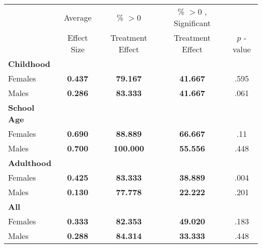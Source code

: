 \begin{tabular}{l c c c c}
\toprule
 & Average & \% $ >0 $ & \% $ >0 $ , Significant & \citet{Rosenbaum_2005_Distribution_JRSS} \\
 & Effect Size & Treatment Effect & Treatment Effect & $ p $ -value \\
\midrule
\textbf{Childhood} & & & & \\
\quad Females &  \textbf{    0.437} & \textbf{   79.167} & \textbf{   41.667} & .595 \\
\quad Males &  \textbf{    0.286} & \textbf{   83.333} & \textbf{   41.667} & .061 \\
\midrule
\textbf{School Age} & & & & \\
\quad Females &  \textbf{    0.690} & \textbf{   88.889} & \textbf{   66.667} & .11 \\
\quad Males &  \textbf{    0.700} & \textbf{  100.000} & \textbf{   55.556} & .448 \\
\midrule
\textbf{Adulthood} & & & & \\
\quad Females &  \textbf{    0.425} & \textbf{   83.333} & \textbf{   38.889} & .004 \\
\quad Males &  \textbf{    0.130} & \textbf{   77.778} & \textbf{   22.222} & .201 \\
\midrule
\textbf{All} & & & & \\
\quad Females &  \textbf{    0.333} & \textbf{   82.353} & \textbf{   49.020} & .183 \\
\quad Males &  \textbf{    0.288} & \textbf{   84.314} & \textbf{   33.333} & .448 \\
\midrule
\bottomrule
\end{tabular}
